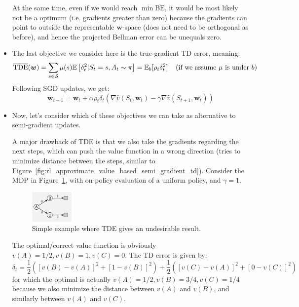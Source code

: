 \begin{itemize}
	At the same time, even if we would reach $\min \overline{\text{BE}}$, it would be most likely not be a optimum (i.e. gradients greater than zero) because the gradients can point to outside the representable $\bm{w}$-space (does not need to be orthogonal as before), and hence the projected Bellman error can be unequals zero.
	
	\item The last objective we consider here is the true-gradient TD error, meaning: $$\overline{\text{TDE}}(\bm{w})=\sum_{s\in\mathcal{S}}\mu(s)\mathbb{E}\left[\delta_t^2 |S_t=s,A_t\sim \pi\right] = \mathbb{E}_{b}[\rho_t \delta_t^2] \hspace{4mm}\text{(if we assume $\mu$ is under $b$)}$$
	Following SGD updates, we get:
	$$\bm{w}_{t+1}=\bm{w}_t + \alpha \rho_t \delta_t (\nabla \hat{v}(S_t,\bm{w}_t) - \gamma \nabla \hat{v}(S_{t+1},\bm{w}_t))$$
	
	\item Now, let's consider which of these objectives we can take as alternative to semi-gradient updates. 
	
	A major drawback of TDE is that we also take the gradients regarding the next steps, which can push the value function in a wrong direction (tries to minimize distance between the steps, similar to Figure~\ref{fig:rl_approximate_value_based_semi_gradient_td}). Consider the MDP in Figure~\ref{fig:rl_approximation_value_based_TDE}, with on-policy evaluation of a uniform policy, and $\gamma=1$.
	
	\begin{figure}[ht!]
		\centering
		\includegraphics[width=0.2\textwidth]{figures/rl_approximation_value_based_TDE.png}
		\caption{Simple example where TDE gives an undesirable result.}
		\label{fig:rl_approximation_value_based_TDE}
	\end{figure}

	The optimal/correct value function is obviously $v(A)=1/2, v(B)=1, v(C)=0$. The TD error is given by:
	$$\delta_t=\frac{1}{2}\left(\left[v(B)-v(A)\right]^2 + \left[1-v(B)\right]^2\right)+\frac{1}{2}\left(\left[v(C)-v(A)\right]^2 + \left[0-v(C)\right]^2\right)$$
	for which the optimal is actually $v(A)=1/2, v(B)=3/4, v(C)=1/4$ because we also minimize the distance between $v(A)$ and $v(B)$, and similarly between $v(A)$ and $v(C)$.
	

\end{itemize}
